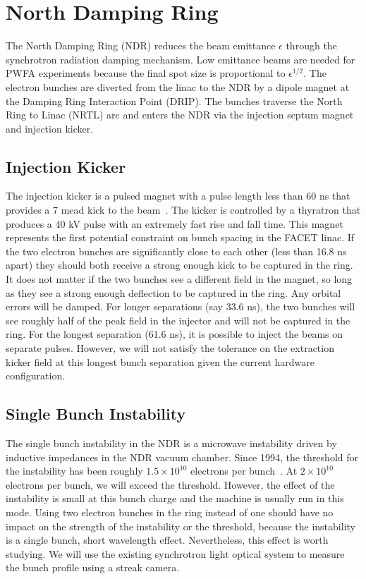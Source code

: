 \documentclass[aps,prl,preprint,groupedaddress]{revtex4-1}
\begin{document}
\section{North Damping Ring}
The North Damping Ring (NDR) reduces the beam emittance $\epsilon$ through the synchrotron radiation damping mechanism. Low emittance beams are needed for PWFA experiments because the final spot size is proportional to $\epsilon^{1/2}$. The electron bunches are diverted from the linac to the NDR by a dipole magnet at the Damping Ring Interaction Point (DRIP). The bunches traverse the North Ring to Linac (NRTL) arc and enters the NDR via the injection septum magnet and injection kicker.  

\subsection{Injection Kicker}
The injection kicker is a pulsed magnet with a pulse length less than 60 ns that provides a 7 mead kick to the beam~\cite{kicker}. The kicker is controlled by a thyratron that produces a 40 kV pulse with an extremely fast rise and fall time. This magnet represents the first potential constraint on bunch spacing in the FACET linac. If the two electron bunches are significantly close to each other (less than 16.8 ns apart) they should both receive a strong enough kick to be captured in the ring. It does not matter if the two bunches see a different field in the magnet, so long as they see a strong enough deflection to be captured in the ring. Any orbital errors will be damped. For longer separations (say 33.6 ns), the two bunches will see roughly half of the peak field in the injector and will not be captured in the ring. For the longest separation (61.6 ns), it is possible to inject the beams on separate pulses. However, we will not satisfy the tolerance on the extraction kicker field at this longest bunch separation given the current hardware configuration.

\subsection{Single Bunch Instability}
The single bunch instability in the NDR is a microwave instability driven by inductive impedances in the NDR vacuum chamber. Since 1994, the threshold for the instability has been roughly $1.5 \times 10^{10}$ electrons per bunch~\cite{sawtooth}. At $2 \times 10^{10}$ electrons per bunch, we will exceed the threshold. However, the effect of the instability is small at this bunch charge and the machine is usually run in this mode. Using two electron bunches in the ring instead of one should have no impact on the strength of the instability or the threshold, because the instability is a single bunch, short wavelength effect. Nevertheless, this effect is worth studying. We will use the existing synchrotron light optical system to measure the bunch profile using a streak camera.
\end{document}
